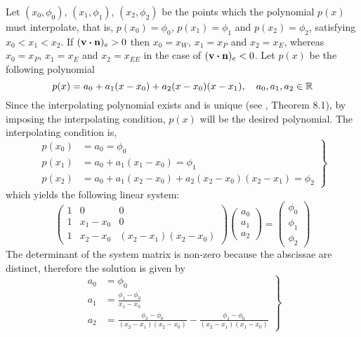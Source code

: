 \noindent
Let $(x_0, \phi_0)$, $(x_1, \phi_1)$, $(x_2, \phi_2)$ be the points which the
polynomial $p(x)$ must interpolate, that is, $p(x_0) = \phi_0$, $p(x_1) =
\phi_1$ and $p(x_2) = \phi_2$, satisfying $x_0 < x_1 < x_2$. If $(\vb{v} \vdot
\vb{n})_e > 0$ then $x_0 = x_W$, $x_1 = x_P$ and $x_2 = x_E$, whereas $x_0 =
x_P$, $x_1 = x_E$ and $x_2 = x_{EE}$ in the case of $(\vb{v} \vdot \vb{n})_e <
0$. Let $p(x)$ be the following polynomial
\begin{equation}
	p(x) = a_0 + a_1 (x - x_0) + a_2 (x - x_0) (x - x_1), \quad a_0, a_1, a_2 \in \mathbb{R}
\end{equation}
Since the interpolating polynomial exists and is unique (see
\cite{quarteroni2010numerical8pinterp}, Theorem 8.1), by imposing the
interpolating condition, $p(x)$ will be the desired polynomial. The
interpolating condition is,
\begin{equation}
	\left.
	\begin{aligned}
		p(x_0) &= a_0 = \phi_0 \\
		p(x_1) &= a_0 + a_1 (x_1 - x_0) = \phi_1 \\
		p(x_2) &= a_0 + a_1 (x_2 - x_0) + a_2 (x_2 - x_0) (x_2 - x_1) = \phi_2
	\end{aligned}	
	\right\}
\end{equation}
which yields the following linear system:
\begin{equation}
	\begin{pmatrix}
		1 & 0 & 0 \\
		1 & x_1 - x_0 & 0 \\
		1 & x_2 - x_0 & (x_2 - x_1)(x_2 - x_0)
	\end{pmatrix}
	\begin{pmatrix}
		a_0 \\ a_1 \\ a_2
	\end{pmatrix} = 
	\begin{pmatrix}
		\phi_0 \\ \phi_1 \\ \phi_2
	\end{pmatrix}
\end{equation}
The determinant of the system matrix is non-zero because the abscissae are
distinct, therefore the solution is given by
\begin{equation}
	\left.
	\begin{aligned}
		a_0 &= \phi_0 \\
		a_1 &= \frac{\phi_1 - \phi_0}{x_1 - x_0} \\
		a_2 &= \frac{\phi_2 - \phi_0}{(x_2 - x_1)(x_2 - x_0)} - \frac{\phi_1 - \phi_0}{(x_2 - x_1)(x_1 - x_0)}
	\end{aligned}	
	\right\}
\end{equation}
